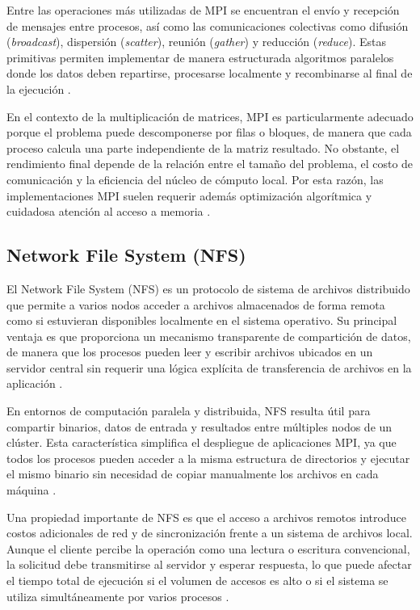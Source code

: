 Entre las operaciones más utilizadas de MPI se encuentran el envío y recepción de mensajes entre procesos, así como las comunicaciones colectivas como difusión (\textit{broadcast}), dispersión (\textit{scatter}), reunión (\textit{gather}) y reducción (\textit{reduce}). Estas primitivas permiten implementar de manera estructurada algoritmos paralelos donde los datos deben repartirse, procesarse localmente y recombinarse al final de la ejecución \parencite{mpiForum2021}.

En el contexto de la multiplicación de matrices, MPI es particularmente adecuado porque el problema puede descomponerse por filas o bloques, de manera que cada proceso calcula una parte independiente de la matriz resultado. No obstante, el rendimiento final depende de la relación entre el tamaño del problema, el costo de comunicación y la eficiencia del núcleo de cómputo local. Por esta razón, las implementaciones MPI suelen requerir además optimización algorítmica y cuidadosa atención al acceso a memoria \parencite{snir1998mpi2,pacheco1997parallel}.

\subsection{Network File System (NFS)}

El Network File System (NFS) es un protocolo de sistema de archivos distribuido que permite a varios nodos acceder a archivos almacenados de forma remota como si estuvieran disponibles localmente en el sistema operativo. Su principal ventaja es que proporciona un mecanismo transparente de compartición de datos, de manera que los procesos pueden leer y escribir archivos ubicados en un servidor central sin requerir una lógica explícita de transferencia de archivos en la aplicación \parencite{sandberg1985nfs,stoner1995design}.

En entornos de computación paralela y distribuida, NFS resulta útil para compartir binarios, datos de entrada y resultados entre múltiples nodos de un clúster. Esta característica simplifica el despliegue de aplicaciones MPI, ya que todos los procesos pueden acceder a la misma estructura de directorios y ejecutar el mismo binario sin necesidad de copiar manualmente los archivos en cada máquina \parencite{tanenbaum2015distributed,storm1988nfs}.

Una propiedad importante de NFS es que el acceso a archivos remotos introduce costos adicionales de red y de sincronización frente a un sistema de archivos local. Aunque el cliente percibe la operación como una lectura o escritura convencional, la solicitud debe transmitirse al servidor y esperar respuesta, lo que puede afectar el tiempo total de ejecución si el volumen de accesos es alto o si el sistema se utiliza simultáneamente por varios procesos \parencite{tanenbaum2015distributed,stone1995filesystem}.

